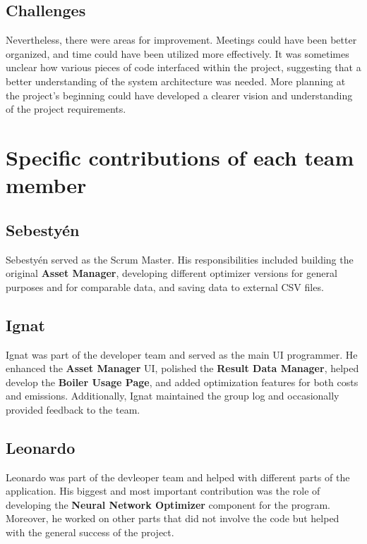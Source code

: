 \documentclass[12pt]{report}
\begin{document}
\subsection*{Challenges}
Nevertheless, there were areas for improvement. Meetings could have been better organized, and 
time could have been utilized more effectively. It was sometimes unclear how various pieces of code interfaced 
within the project, suggesting that a better understanding of the system architecture was needed. 
More planning at the project's beginning could have developed a clearer vision and understanding of the project requirements.

\section{Specific contributions of each team member}

\subsection*{Sebestyén}
Sebestyén served as the Scrum Master. His responsibilities included building the original \textbf{Asset Manager}, 
developing different optimizer versions for general purposes and for comparable data, and saving data to external CSV files.

\subsection*{Ignat}
Ignat was part of the developer team and served as the main UI programmer. 
He enhanced the \textbf{Asset Manager} UI, polished the \textbf{Result Data Manager}, helped develop the \textbf{Boiler 
Usage Page}, and added optimization features for both costs and emissions. Additionally, Ignat maintained 
the group log and occasionally provided feedback to the team.

\subsection*{Leonardo}
Leonardo was part of the devleoper team and helped with different parts of the application. His biggest and most important contribution was the role of developing the \textbf{Neural Network Optimizer} component for the program.
Moreover, he worked on other parts that did not involve the code but helped with the general success of the project. 
\end{document}
